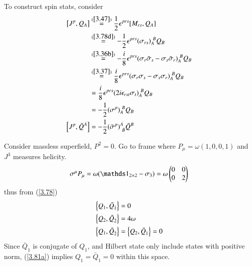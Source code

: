 To construct spin stats, consider
\begin{subequations}
   \begin{align}
   \comm{J^p}{Q_A} &\stackrel{(\ref{3.47})}{=} \frac{1}{2} \epsilon^{p r s} \comm{M_{rs}}{Q_A} \notag \\
                   &\stackrel{(\ref{3.78d})}{=} - \frac{1}{2} \epsilon^{prs} (\sigma_{rs})^{\ B}_A Q_B \notag \\
                   &\stackrel{(\ref{3.36b})}{=} - \frac{i}{8} \epsilon^{prs} (\sigma_r \bar \sigma_s - \sigma_s \bar\sigma_r)^{\ B}_{A} Q_B \notag \\
                   &\stackrel{(\ref{3.37})}{=} \frac{i}{8} \epsilon^{prs} (\sigma_r \sigma_s - \sigma_s \sigma_r)^{\ B}_A Q_B \notag \\ 
                   &= \frac{i}{8} \epsilon^{prs} (2i\epsilon_{rst}\sigma_t)_A^{\ B} Q_B  \notag \\
                   &= - \frac{1}{2} (\sigma^p)_A^{\ B} Q_B \label{3.80a} \\
   \comm{J^p}{\bar Q^{\dot{A}}} &= - \frac{1}{2} (\bar \sigma^p)^{\dot{A}}_{\ \dot{B}} \bar Q^{\dot{B}} \label{3.80b}
\end{align}
\end{subequations}

Consider massless superfield, $P^2 = 0$. Go to frame where $P_\mu = \omega (1,0,0,1)$ and $J^3$ measures helicity.
\begin{equation}
   \sigma^\mu P_\mu = \omega (\id_{2\times 2} - \sigma_3) = \omega \begin{pmatrix} 0 & 0 \\ 0 & 2 \end{pmatrix}
\end{equation}
thus from (\ref{3.78})
\begin{subequations}
   \label{3.81}
  \begin{align}
     \acomm{Q_1}{\bar{Q}_{\dot{1}}} &= 0 \label{3.81a} \\
     \acomm{Q_2}{\bar{Q}_{\dot{2}}} &= 4 \omega \label{3.81b} \\ 
     \acomm{Q_1}{\bar{Q}_{\dot{2}}} &= \acomm{Q_2}{\bar{Q}_{\dot{1}}} = 0 \label{3.81c}
  \end{align} 
\end{subequations}
Since $\bar{Q}_1$ is conjugate of $Q_1$, and Hilbert state only include states with positive norm, (\ref{3.81a}) implies $Q_1 = \bar{Q}_{\dot{1}} = 0$ within this space.

